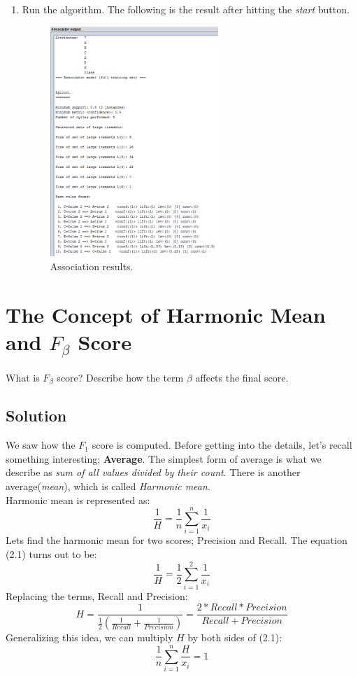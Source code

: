 \documentclass[12pt]{article}
\numberwithin{equation}{section}
\numberwithin{table}{section}
\numberwithin{figure}{section}
\begin{document}
\begin{enumerate}
	\item Run the algorithm. The following is the result after hitting the \textit{start} button.
	\begin{figure} \centering
		\includegraphics[width=0.6\textwidth]{associator_output.png}
		\caption{Association results.}
		\label{figsolplot}
	\end{figure}
\end{enumerate}

\newpage
\section{The Concept of Harmonic Mean and $F_{\beta}$ Score}
What is $F_{\beta}$ score? Describe how the term $\beta$ affects the final score.
\subsection*{Solution}
We saw how the $F_1$ score is computed. Before getting into the details, let's recall something interesting; \textbf{Average}.
The simplest form of average is what we describe as \textit{sum of all values divided by their count}. There is another average(\textit{mean}), which is called \textit{Harmonic mean}.\\
 Harmonic mean is represented as:
\begin{equation}
	\frac{1}{H}	= \frac{1}{n}\sum_{i=1}^{n}\frac{1}{x_{i}}
\end{equation}
Lets find the harmonic mean for two scores; Precision and Recall. The equation (2.1) turns out to be:
$$
	\frac{1}{H}	= \frac{1}{2}\sum_{i=1}^{2}\frac{1}{x_{i}}
$$	
Replacing the terms, Recall and Precision:
\begin{equation}
H = \frac{1}{\frac{1}{2}(\frac{1}{Recall} + \frac{1}{Precision})} =  \frac{2*Recall*Precision}{Recall + Precision}
\end{equation}
Generalizing this idea, we can multiply $H$ by both sides of (2.1):
\begin{equation}
	\frac{1}{n}\sum_{i=1}^{n}\frac{H}{x_i} = 1
\end{equation}
\end{document}
